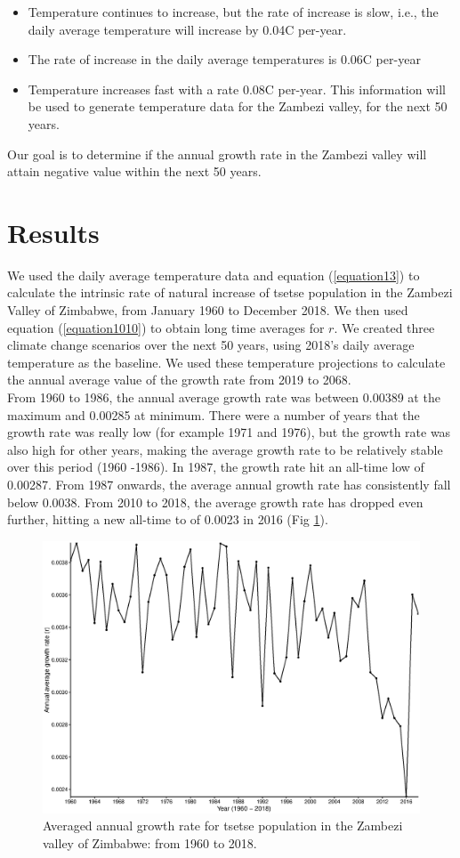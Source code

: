 \documentclass[10pt,a4paper]{article}
\begin{document}
\begin{itemize}
	\item 	Temperature continues to increase, but the rate of increase is  slow, i.e., the daily average temperature will increase by 0.04\degree C  per-year. 
	\item The rate of increase in the daily average temperatures is 0.06\degree C  per-year  
	\item Temperature increases fast with a rate 0.08\degree C  per-year.    
	This information will be used to generate temperature data for the Zambezi valley, for the next 50 years. 	
\end{itemize} 
 Our goal is to determine if the annual growth rate in the Zambezi valley will attain negative value within the next 50 years.

\section*{Results}

We used the daily average temperature data and equation (\ref{equation13}) to calculate the intrinsic rate of natural increase of tsetse population in the Zambezi Valley of Zimbabwe, from January 1960 to December 2018. We then used equation (\ref{equation1010}) to obtain long time averages for $r$.  We created three climate change scenarios over the next 50 years, using 2018's daily average temperature  as the baseline. We used these temperature projections to calculate the annual average value of the growth rate from 2019 to 2068.  \\

From 1960 to 1986, the annual average growth rate was between 0.00389 at the maximum and 0.00285 at minimum. There were a number of years that the growth rate was really low (for example 1971 and 1976), but the growth rate was also high for other years, making  the average growth rate to be relatively stable over this period (1960 -1986). In 1987, the growth rate hit an all-time low of 0.00287. From 1987 onwards, the average annual growth rate has consistently fall below 0.0038.  From 2010 to 2018, the average growth rate has dropped even further, hitting a new all-time to of 0.0023 in 2016 (Fig \ref{fig:tsetseflowchat0}).      

\begin{figure}[hbt!]
	\centering
	\includegraphics[width=0.6\linewidth]{Check1}
	\caption{Averaged annual growth rate for tsetse population in the Zambezi valley of Zimbabwe: from 1960 to 2018. }
	\label{fig:tsetseflowchat0}
\end{figure}
\end{document}
